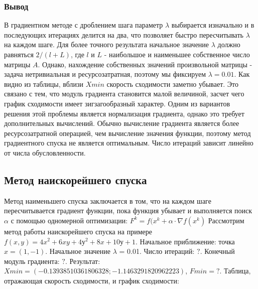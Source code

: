 \subsubsection{Вывод}
В градиентном методе с дроблением шага параметр $\lambda$ выбирается изначально и в последующих итерациях делится на два, что позволяет быстро пересчитывать $\lambda$ на каждом шаге.
Для более точного результата начальное значение $\lambda$ должно равняться {$2/(l + L)$}, где $l$ и $L$  - наибольшое и наименьшее собственное число матрицы $A$.
Однако, нахождение собственных значений произвольной матрицы - задача нетривиальная и ресурсозатратная, поэтому мы фиксируем $\lambda = 0.01$.
\newline
\newline
Как видно из таблицы, вблизи $Xmin$ скорость сходимости заметно убывает.
Это связано с тем, что модуль градиента становится малой величиной, засчет чего график сходимости имеет зигзагообразный характер.
Одним из вариантов решения этой проблемы является нормализация градиента, однако это требует дополнительных вычислений.
\newline
\newline
Обычно вычисление градиента является более ресурсозатратной операцией, чем вычисление значения функции, поэтому метод градиентного спуска не является оптимальным.
Число итераций зависит линейно от числа обусловленности.
\newpage

\subsection{Метод наискорейшего спуска}\label{subsec:метод-наискорейшего-спуска2}
Метод наименьшего спуска заключается в том, что на каждом шаге пересчитывается градиент функции, пока функция убывает и выполняется поиск $\alpha$ с помощью одномерной оптимизации:
\newline
$F^k = f(x^k + \alpha \cdot \nabla{f(x^k)}$
\newline
Рассмотрим метод работы наискорейшего спуска на примере {$f(x,y) = 4x^2 + 6xy + 4у^2 + 8x + 10у + 1$}.
Начальное приближение: точка {$x = (1, -1)$}. \newline
Начальное значение $\lambda$ = 0.01. \newline
Число итераций: $?$. \newline
Конечный модуль градиента: $?$.\newline
Результат: $Xmin = (-0.13938510361806328; -1.1463291820962223)$, $Fmin = ?$.
\newline
\newline
Таблица, отражающая скорость сходимости, и график сходимости:

